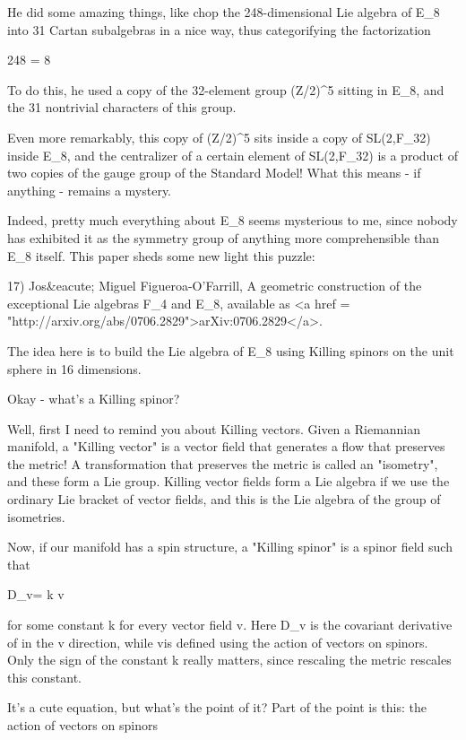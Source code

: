 He did some amazing things, like chop the 248-dimensional Lie 
algebra of E_{8} into 31 Cartan subalgebras in a nice way, thus 
categorifying the factorization

248 = 8 

To do this, he used a copy of the 32-element group (Z/2)^{5}
sitting in E_{8}, and the 31 nontrivial characters of this group.

Even more remarkably, this copy of (Z/2)^{5} sits inside a
copy of SL(2,F_{32}) inside E_{8}, and the centralizer
of a certain element of SL(2,F_{32}) is a product of two
copies of the gauge group of the Standard Model!  What this means - if
anything - remains a mystery.

Indeed, pretty much everything about E_{8} seems mysterious to me,
since nobody has exhibited it as the symmetry group of anything
more comprehensible than E_{8} itself.  This paper sheds some
new light this puzzle:

17) Jos&eacute; Miguel Figueroa-O'Farrill, A geometric construction
of the exceptional Lie algebras F_{4} and E_{8}, available as
<a href = "http://arxiv.org/abs/0706.2829">arXiv:0706.2829</a>.

The idea here is to build the Lie algebra of E_{8} using Killing 
spinors on the unit sphere in 16 dimensions. 

Okay - what's a Killing spinor?  

Well, first I need to remind you about Killing vectors.  Given
a Riemannian manifold, a "Killing vector" is a vector field that 
generates a flow that preserves the metric!  A transformation 
that preserves the metric is called an "isometry", and these 
form a Lie group.  Killing vector fields form a Lie algebra 
if we use the ordinary Lie bracket of vector fields, and this 
is the Lie algebra of the group of isometries.

Now, if our manifold has a spin structure, a "Killing spinor" is
a spinor field \psi  such that 

D_{v}\psi  = k v\psi 

for some constant k for every vector field v.  Here D_{v}\psi 
is the covariant derivative of \psi  in the v direction, while
v\psi  is defined using the action of vectors on spinors.
Only the sign of the constant k really matters, since rescaling 
the metric rescales this constant.  

It's a cute equation, but what's the point of it?  Part
of the point is this: the action of vectors on spinors

